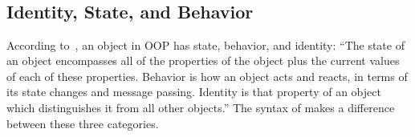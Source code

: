 \begin{figure*}
\begin{multicols}{2}
\begin{tabbing}
  \> \alt \V{(}  \V{)} \\
  \> \alt {} \V{:}  \\
  \> \alt {}  \\
  \> \alt {}   \\
 \df {} \alt {} \alt {} \alt \V{\$} \\
  \> \alt \V{\^{}} \alt \V{*} \alt {}  \\
 \df {} \alt {} \alt {} \\
  \> \alt {} \alt {} \alt {} \\
 \df {}  \\
 \df \RE{[\textbackslash{}dA-F][\textbackslash{}dA-F]} \\
 \df {} \\
 \df {} \\
 \df {} \\
 \df {} \\
 \df {}  \\
 \df {} \\
\end{tabbing}
\end{multicols}
\label{fig:bnf}
\end{figure*}

\subsection{Identity, State, and Behavior}

According to~\citet{grady2007object}, an object in OOP has state, behavior, and identity:
``The state of an object encompasses all of the properties of
the object plus the current values of each of these properties.
Behavior is how an object acts and reacts, in terms of its state changes and message passing.
Identity is that property of an object which distinguishes it from all other objects.''
The syntax of \eo{} makes a difference between these three categories.

